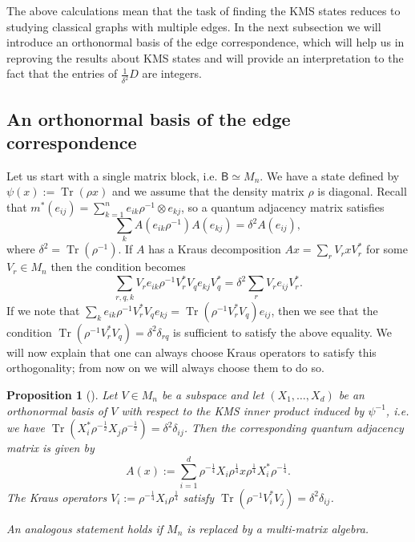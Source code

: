 \documentclass[a4paper,reqno]{amsart}
\numberwithin{equation}{section}
\numberwithin{theorem}{section}
\newtheorem{proposition}[theorem]{Proposition}
\theoremstyle{definition}\newtheorem{definition}[theorem]{Definition}
\theoremstyle{definition}\newtheorem{remark}[theorem]{Remark}
\theoremstyle{definition}\newtheorem{example}[theorem]{Example}
\theoremstyle{definition}\newtheorem*{notation*}{Notation}
\theoremstyle{definition}\newtheorem*{convention*}{Convention}
\theoremstyle{definition}\newtheorem{observation}{Observation}
\theoremstyle{definition}\newtheorem*{acknowledgment*}{Acknowledgments}
\newcommand{\B}{\mathsf{B}}
\renewcommand{\op}[1]{\operatorname{#1}}
\begin{document}
The above calculations  mean that the task of finding the KMS states reduces to studying classical graphs with multiple edges. In the next subsection we will introduce an orthonormal basis of the edge correspondence, which will help us in reproving the results about KMS states and will provide an interpretation to the fact that the entries of $\frac{1}{\delta^2} D$ are integers.

\subsection{An orthonormal basis of the edge correspondence}\label{subsec:orth}

Let us start with a single matrix block, i.e. $\B \simeq M_n$. We have a state defined by $\psi(x):= \op{Tr}(\rho x)$ and we assume that the density matrix $\rho$ is diagonal. Recall that $m^{\ast}(e_{ij}) = \sum_{k=1}^n e_{ik}\rho^{-1} \otimes e_{kj}$, so a quantum adjacency matrix satisfies
\[
\sum_{k}A(e_{ik} \rho^{-1}) A(e_{kj}) = \delta^2 A(e_{ij}),
\]
where $\delta^2= \op{Tr}(\rho^{-1})$. If $A$ has a Kraus decomposition $Ax = \sum_{r} V_{r} x V_{r}^{\ast}$ for some $V_r\in M_n$ then the condition becomes
\[
\sum_{r,q,k} V_{r} e_{ik} \rho^{-1} V_{r}^{\ast} V_{q} e_{kj} V_{q}^{\ast} = \delta^2 \sum_{r} V_{r} e_{ij} V_{r}^{\ast}.
\]
If we note that $\sum_{k} e_{ik} \rho^{-1} V_{r}^{\ast} V_{q} e_{kj} = \op{Tr}(\rho^{-1} V_{r}^{\ast} V_{q}) e_{ij}$, then we see that the condition $\op{Tr}(\rho^{-1} V_{r}^{\ast} V_{q}) = \delta^2 \delta_{rq}$ is sufficient to satisfy the above equality. We will now explain that one can always choose Kraus operators to satisfy this orthogonality; from now on we will always choose them to do so.
\begin{proposition}[{\cite[Proposition 3.30]{Was}}]\label{Prop:qadjformula}
Let $V \in M_n$ be a subspace and let $(X_1, \dots, X_d)$ be an orthonormal basis of $V$ with respect to the KMS inner product induced by $\psi^{-1}$, i.e. we have $\op{Tr}(X_{i}^{\ast} \rho^{-\frac{1}{2}} X_{j} \rho^{-\frac{1}{2}}) = \delta^2 \delta_{ij}$. Then the corresponding quantum adjacency matrix is given by
\[
A(x):= \sum_{i=1}^{d} \rho^{-\frac{1}{4}} X_i \rho^{\frac{1}{4}} x \rho^{\frac{1}{4}} X_{i}^{\ast}  \rho^{-\frac{1}{4}}.
\]
The Kraus operators $V_{i}:= \rho^{-\frac{1}{4}} X_i \rho^{\frac{1}{4}} $ satisfy $\op{Tr}(\rho^{-1} V_{i}^{\ast} V_{j}) = \delta^2 \delta_{ij}$.

An analogous statement holds if $M_n$ is replaced by a multi-matrix algebra.
\end{proposition}
\end{document}
